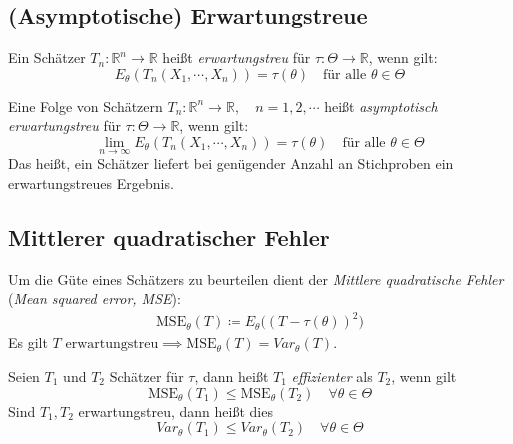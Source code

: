 \documentclass[a4paper, 11pt, accentcolor = tud3b]{tudreport}
\newcommand{\R}{\ensuremath{\mathbb{R}}}
\newcommand{\Var}{\ensuremath{\textit{Var}}}
\newcommand{\MSE}{\ensuremath{\textrm{MSE}}}
\begin{document}
			\subsection{(Asymptotische) Erwartungstreue}
				Ein Schätzer \( T_n : \R^n \rightarrow \R \) heißt \textit{erwartungstreu} für \( \tau : \Theta \rightarrow \R \), wenn gilt:
				\begin{equation*}
					E_\theta(T_n(X_1, \cdots, X_n)) = \tau(\theta) \quad \textrm{für alle } \theta \in \Theta
				\end{equation*}
				
				Eine Folge von Schätzern \( T_n : \R^n \rightarrow \R, \quad n = 1, 2, \cdots \) heißt \textit{asymptotisch erwartungstreu} für \( \tau : \Theta \rightarrow \R \), wenn gilt:
				\begin{equation*}
					\lim\limits_{n \rightarrow \infty} E_\theta(T_n(X_1, \cdots, X_n)) = \tau(\theta) \quad \textrm{für alle } \theta \in \Theta
				\end{equation*}
				Das heißt, ein Schätzer liefert bei genügender Anzahl an Stichproben ein erwartungstreues Ergebnis.

            \subsection{Mittlerer quadratischer Fehler}
                Um die Güte eines Schätzers zu beurteilen dient der \textit{Mittlere quadratische Fehler} (\textit{Mean squared error, MSE}):
                \begin{eqnarray}
	                \MSE_\theta(T) \coloneqq E_\theta\big((T - \tau(\theta))^2\big)
                \end{eqnarray}
                Es gilt \( T \textrm{ erwartungstreu} \implies \MSE_\theta(T) = \Var_\theta(T) \).
                
                Seien \( T_1 \) und \(T_2\) Schätzer für \(\tau\), dann heißt \(T_1\) \textit{effizienter} als \(T_2\), wenn gilt
                \begin{equation*}
	                \MSE_\theta(T_1) \leq \MSE_\theta(T_2) \quad \forall \theta \in \Theta
                \end{equation*}
                Sind \( T_1, T_2 \) erwartungstreu, dann heißt dies
                \begin{equation*}
	                \Var_\theta(T_1) \leq \Var_\theta(T_2) \quad \forall \theta \in \Theta
                \end{equation*}
\end{document}
